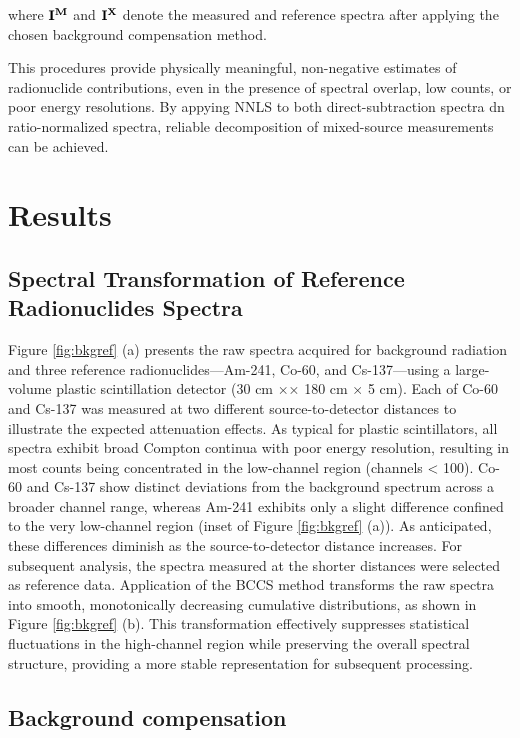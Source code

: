 \documentclass[10pt]{wlscirep}
\begin{document}
where $\bf{I}^M$ and $\bf{I}^{X}$ denote the measured and reference spectra after applying the chosen background compensation method.

This procedures provide physically meaningful, non-negative estimates of radionuclide contributions, even in the presence of spectral overlap, low counts, or poor energy resolutions. By appying NNLS to both direct-subtraction spectra dn ratio-normalized spectra, reliable decomposition of mixed-source measurements can be achieved.

\section*{Results}


\subsection*{Spectral Transformation of Reference Radionuclides Spectra}

Figure \ref{fig:bkgref} (a) presents the raw spectra acquired for background radiation and three reference radionuclides—Am-241, Co-60, and Cs-137—using a large-volume plastic scintillation detector (30 cm $\times$× 180 cm $\times$ 5 cm). Each of Co-60 and Cs-137 was measured at two different source-to-detector distances to illustrate the expected attenuation effects. As typical for plastic scintillators, all spectra exhibit broad Compton continua with poor energy resolution, resulting in most counts being concentrated in the low-channel region (channels < 100). Co-60 and Cs-137 show distinct deviations from the background spectrum across a broader channel range, whereas Am-241 exhibits only a slight difference confined to the very low-channel region (inset of Figure \ref{fig:bkgref} (a)). As anticipated, these differences diminish as the source-to-detector distance increases. For subsequent analysis, the spectra measured at the shorter distances were selected as reference data.
Application of the BCCS method transforms the raw spectra into smooth, monotonically decreasing cumulative distributions, as shown in Figure \ref{fig:bkgref} (b). This transformation effectively suppresses statistical fluctuations in the high-channel region while preserving the overall spectral structure, providing a more stable representation for subsequent processing.


\subsection*{Background compensation}
\end{document}
